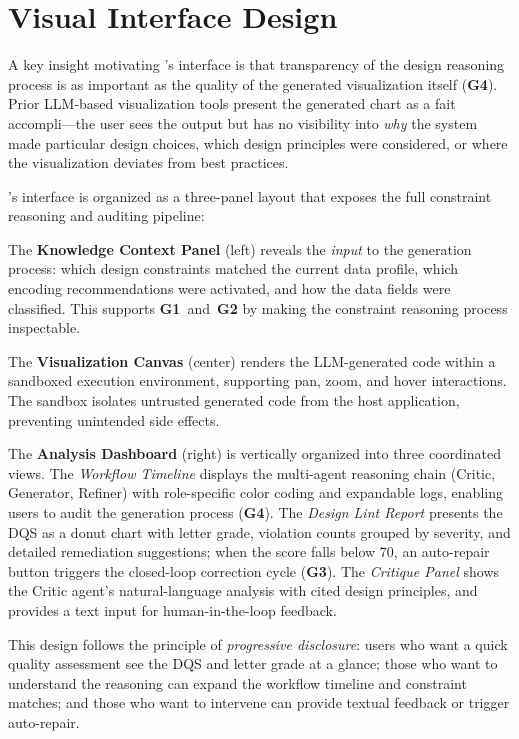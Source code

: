 \section{Visual Interface Design}
\label{sec:interface}

A key insight motivating \sysname{}'s interface is that transparency of the design reasoning process is as important as the quality of the generated visualization itself (\textbf{G4}). Prior LLM-based visualization tools present the generated chart as a fait accompli---the user sees the output but has no visibility into \textit{why} the system made particular design choices, which design principles were considered, or where the visualization deviates from best practices.

\sysname{}'s interface is organized as a three-panel layout that exposes the full constraint reasoning and auditing pipeline:

The \textbf{Knowledge Context Panel} (left) reveals the \textit{input} to the generation process: which design constraints matched the current data profile, which encoding recommendations were activated, and how the data fields were classified. This supports \textbf{G1}~and~\textbf{G2} by making the constraint reasoning process inspectable.

The \textbf{Visualization Canvas} (center) renders the LLM-generated code within a sandboxed execution environment, supporting pan, zoom, and hover interactions. The sandbox isolates untrusted generated code from the host application, preventing unintended side effects.

The \textbf{Analysis Dashboard} (right) is vertically organized into three coordinated views. The \textit{Workflow Timeline} displays the multi-agent reasoning chain (Critic, Generator, Refiner) with role-specific color coding and expandable logs, enabling users to audit the generation process (\textbf{G4}). The \textit{Design Lint Report} presents the DQS as a donut chart with letter grade, violation counts grouped by severity, and detailed remediation suggestions; when the score falls below 70, an auto-repair button triggers the closed-loop correction cycle (\textbf{G3}). The \textit{Critique Panel} shows the Critic agent's natural-language analysis with cited design principles, and provides a text input for human-in-the-loop feedback.

This design follows the principle of \textit{progressive disclosure}: users who want a quick quality assessment see the DQS and letter grade at a glance; those who want to understand the reasoning can expand the workflow timeline and constraint matches; and those who want to intervene can provide textual feedback or trigger auto-repair.


